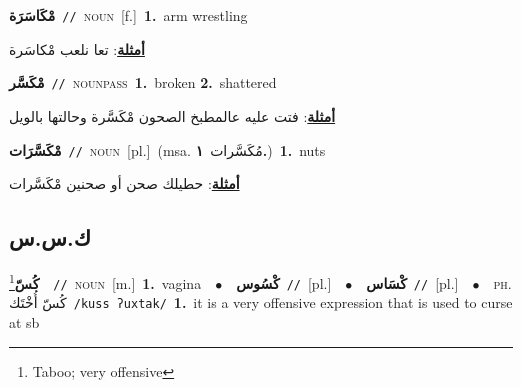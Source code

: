 \documentclass[10pt,a4paper,twoside]{article} %
\begin{document}
\begin{multicols}{2}
{\setlength\topsep{0pt}\textbf{\foreignlanguage{arabic}{مْكَاسَرَة}}\ {\color{gray}\texttt{//}\color{black}}\ \textsc{noun}\ [f.]\ \textbf{1.}~arm wrestling\  \begin{flushright}\color{gray}\foreignlanguage{arabic}{\textbf{\underline{\foreignlanguage{arabic}{أمثلة}}}: تعا نلعب مْكاسَرة}\end{flushright}\color{black}} \vspace{2mm}

{\setlength\topsep{0pt}\textbf{\foreignlanguage{arabic}{مْكَسَّر}}\ {\color{gray}\texttt{//}\color{black}}\ \textsc{noun\textunderscore pass}\ \textbf{1.}~broken  \textbf{2.}~shattered\  \begin{flushright}\color{gray}\foreignlanguage{arabic}{\textbf{\underline{\foreignlanguage{arabic}{أمثلة}}}: فتت عليه عالمطبخ الصحون مْكَسَّرة وحالتها بالويل}\end{flushright}\color{black}} \vspace{2mm}

{\setlength\topsep{0pt}\textbf{\foreignlanguage{arabic}{مْكَسَّرَات}}\ {\color{gray}\texttt{//}\color{black}}\ \textsc{noun}\ [pl.]\ \color{gray}(msa. \foreignlanguage{arabic}{مُكَسَّرات}~\foreignlanguage{arabic}{\textbf{١.}})\color{black}\ \textbf{1.}~nuts\  \begin{flushright}\color{gray}\foreignlanguage{arabic}{\textbf{\underline{\foreignlanguage{arabic}{أمثلة}}}: حطيلك صحن أو صحنين مْكَسَّرات}\end{flushright}\color{black}} \vspace{2mm}

\vspace{-3mm}
\subsection*{\color{blue}\foreignlanguage{arabic}{ك.س.س}\color{blue}{}} 

{\setlength\topsep{0pt}\textbf{\foreignlanguage{arabic}{كُسّ}}\footnote{Taboo; very offensive}\ \ {\color{gray}\texttt{//}\color{black}}\ \textsc{noun}\ [m.]\ \textbf{1.}~vagina\ \ $\bullet$\ \ \setlength\topsep{0pt}\textbf{\foreignlanguage{arabic}{كْسُوس}}\ {\color{gray}\texttt{//}\color{black}}\ [pl.]\ \ $\bullet$\ \ \setlength\topsep{0pt}\textbf{\foreignlanguage{arabic}{كْسَاس}}\ {\color{gray}\texttt{//}\color{black}}\ [pl.]\ \ $\bullet$\ \ \textsc{ph.} \color{gray} \foreignlanguage{arabic}{كُسّ أُخْتَك}\color{black}\ {\color{gray}\texttt{/{\sffamily kuss ʔuxtak}/}\color{black}}\ \textbf{1.}~it is a very offensive expression that is used to curse at sb\ } \vspace{2mm}


\end{multicols}
\end{document}

